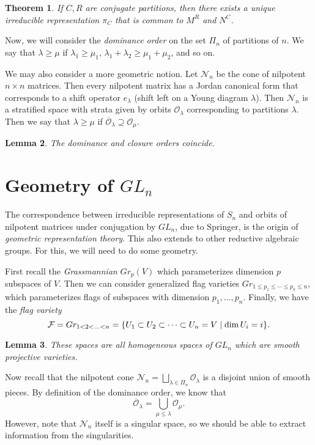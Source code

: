 \documentclass[leqno, openany]{memoir}
\newtheorem{thm}{Theorem}[chapter]
\newtheorem{lem}[thm]{Lemma}
\theoremstyle{definition}
\theoremstyle{remark}
\theoremstyle{plain}
\theoremstyle{definition}
\theoremstyle{remark}
\newcommand{\mc}[1]{\mathcal{#1}}
\newcommand{\ol}[1]{\overline{#1}}
\begin{document}
\begin{thm}
    If $C, R$ are conjugate partitions, then there exists a unique irreducible representation $\pi_C$ that is common to $M^R$ and $N^C$.
\end{thm}

Now, we will consider the \textit{dominance order} on the set $\Pi_n$ of partitions of $n$. We say that $\lambda \geq \mu$ if $\lambda_1 \geq \mu_1$, $\lambda_1 + \lambda_2 \geq \mu_1 + \mu_2$, and so on.

We may also consider a more geometric notion. Let $\mc{N}_n$ be the cone of nilpotent $n \times n$ matrices. Then every nilpotent matrix has a Jordan canonical form that corresponds to a shift operator $e_{\lambda}$ (shift left on a Young diagram $\lambda$). Then $\mc{N}_n$ is a stratified space with strata given by orbits $\mc{O}_{\lambda}$ corresponding to partitions $\lambda$. Then we say that $\lambda \geq \mu$ if $\ol{\mc{O}}_{\lambda} \supseteq \mc{O}_{\mu}$.

\begin{lem}
    The dominance and closure orders coincide.
\end{lem}

\section{Geometry of $GL_n$}%
\label{sec:geometry_of_gl_n_}

The correspondence between irreducible representations of $S_n$ and orbits of nilpotent matrices under conjugation by $GL_n$, due to Springer, is the origin of \textit{geometric representation theory}. This also extends to other reductive algebraic groups. For this, we will need to do some geometry.

First recall the \textit{Grassmannian} $Gr_p(V)$ which parameterizes dimension $p$ subspaces of $V$. Then we can consider generalized flag varieties $Gr_{1 \leq p_1 \leq \cdots \leq p_k \leq n}$, which parameterizes flags of subspaces with dimension $p_1, \ldots, p_n$. Finally, we have the \textit{flag variety}
\[ \mc{F} = Gr_{1<2<\ldots<n} = \qty{U_1 \subset U_2 \subset \cdots \subset U_n = V \mid \dim U_i = i}. \]

\begin{lem}
    These spaces are all homogeneous spaces of $GL_n$ which are smooth projective varieties.
\end{lem}

Now recall that the nilpotent cone $\mc{N}_n = \bigsqcup_{\lambda \in \Pi_n} \mc{O}_{\lambda}$ is a disjoint union of smooth pieces. By definition of the dominance order, we know that
\[ \ol{\mc{O}}_{\lambda} = \bigcup_{\mu \leq \lambda} \mc{O}_{\mu}. \]
However, note that $\mc{N}_n$ itself is a singular space, so we should be able to extract information from the singularities.
\end{document}

